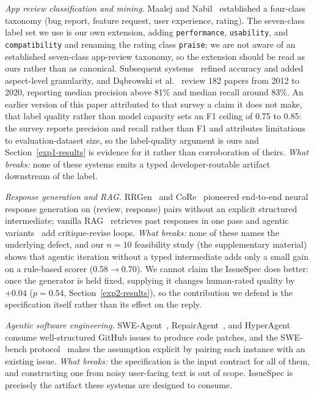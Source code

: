 \documentclass[preprint,12pt]{elsarticle}
\begin{document}
\emph{App review classification and mining.} Maalej and Nabil~\cite{maalej2015bug} established a
four-class taxonomy (bug report, feature request, user experience, rating). The seven-class label
set we use is our own extension, adding \texttt{performance}, \texttt{usability}, and
\texttt{compatibility} and renaming the rating class \texttt{praise}; we are not aware of an
established seven-class app-review taxonomy, so the extension should be read as ours rather than
as canonical. Subsequent systems~\cite{chen2014ar, villarroel2016release, di2017surf,
kaur2023bert, shah2020mining, guzman2014users} refined accuracy and added aspect-level
granularity, and D{\k a}browski et al.~\cite{dkabrowski2022analysing} review 182 papers from 2012
to 2020, reporting median precision above 81\% and median recall around 83\%. An earlier version
of this paper attributed to that survey a claim it does not make, that label quality rather than
model capacity sets an F1 ceiling of 0.75 to 0.85: the survey reports precision and recall rather
than F1 and attributes limitations to evaluation-dataset size, so the label-quality argument is
ours and Section~\ref{exp1-results} is evidence for it rather than corroboration of theirs.
\emph{What breaks:} none of these systems emits a typed developer-routable artifact downstream of
the label.

\emph{Response generation and RAG.} RRGen~\cite{gao2019automating} and
CoRe~\cite{gao2021automating} pioneered end-to-end neural response generation on (review,
response) pairs without an explicit structured intermediate; vanilla RAG~\cite{lewis2020retrieval}
retrieves past responses in one pass and agentic variants~\cite{asai2024self,
khattab2022demonstrate} add critique-revise loops. \emph{What breaks:} none of these names the
underlying defect, and our $n=10$ feasibility study (the supplementary material) shows that
agentic iteration without a typed intermediate adds only a small gain on a rule-based scorer
(0.58$\to$0.70). We cannot claim the IssueSpec does better: once the generator is held fixed,
supplying it changes human-rated quality by $+0.04$ ($p = 0.54$, Section~\ref{exp2-results}), so
the contribution we defend is the specification itself rather than its effect on the reply.

\emph{Agentic software engineering.} SWE-Agent~\cite{yang2024swe},
RepairAgent~\cite{bouzenia2025repairagent}, and HyperAgent~\cite{phan2024hyperagent} consume
well-structured GitHub issues to produce code patches, and the SWE-bench
protocol~\cite{jimenez2023swe} makes the assumption explicit by pairing each instance with an
existing issue. \emph{What breaks:} the specification is the input contract for all of them, and
constructing one from noisy user-facing text is out of scope. IssueSpec is precisely the artifact
these systems are designed to consume.
\end{document}
